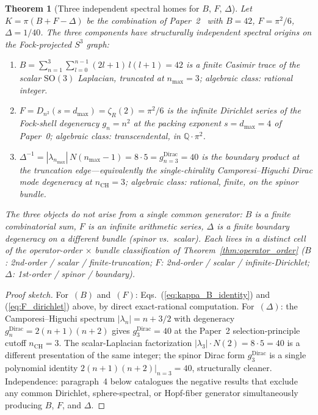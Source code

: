 \documentclass[aps,pra,twocolumn,superscriptaddress,longbibliography]{revtex4-2}
\newtheorem{theorem}{Theorem}
\begin{document}
\begin{theorem}[Three independent spectral homes for $B$, $F$, $\Delta$]
\label{thm:k_decomposition}
Let $K = \pi(B + F - \Delta)$ be the combination of
Paper~2~\cite{loutey_paper2} with $B = 42$, $F = \pi^2/6$,
$\Delta = 1/40$.  The three components have structurally independent
spectral origins on the Fock-projected $S^3$ graph:
\begin{enumerate}
\item[(B)] $B = \sum_{n=1}^{3} \sum_{l=0}^{n-1} (2l{+}1)\,l(l{+}1)
= 42$ is a \emph{finite} Casimir trace of the scalar
$\mathrm{SO}(3)$ Laplacian, truncated at $n_{\max} = 3$;
algebraic class: rational integer.
\item[(F)] $F = D_{n^2}(s = d_{\max}) = \zeta_R(2) = \pi^2/6$
is the \emph{infinite} Dirichlet series of the Fock-shell degeneracy
$g_n = n^2$ at the packing exponent $s = d_{\max} = 4$ of Paper~0;
algebraic class: transcendental, in $\mathbb{Q}\cdot\pi^2$.
\item[($\Delta$)] $\Delta^{-1} = |\lambda_{n_{\max}}|\,
N(n_{\max}{-}1) = 8 \cdot 5 = g_{n=3}^{\mathrm{Dirac}} = 40$ is the
\emph{boundary} product at the truncation edge---equivalently the
single-chirality Camporesi--Higuchi Dirac mode degeneracy at
$n_{\mathrm{CH}} = 3$; algebraic class: rational, finite, on the
\emph{spinor} bundle.
\end{enumerate}
The three objects do not arise from a single common generator:
$B$ is a finite combinatorial sum, $F$ is an infinite arithmetic
series, $\Delta$ is a finite boundary degeneracy on a different
bundle (spinor vs.\ scalar).  Each lives in a distinct cell of the
operator-order $\times$ bundle classification of
Theorem~\ref{thm:operator_order} ($B$: 2nd-order / scalar /
finite-truncation; $F$: 2nd-order / scalar / infinite-Dirichlet;
$\Delta$: 1st-order / spinor / boundary).
\end{theorem}

\begin{proof}[Proof sketch]
For~$(B)$ and~$(F)$: Eqs.~(\ref{eq:kappa_B_identity}) and
(\ref{eq:F_dirichlet}) above, by direct exact-rational computation.
For~$(\Delta)$: the Camporesi--Higuchi spectrum
$|\lambda_n| = n + 3/2$ with degeneracy
$g_n^{\mathrm{Dirac}} = 2(n+1)(n+2)$ gives $g_3^{\mathrm{Dirac}} = 40$
at the Paper~2 selection-principle cutoff $n_{\mathrm{CH}} = 3$.
The scalar-Laplacian factorization $|\lambda_3|\cdot N(2) =
8 \cdot 5 = 40$ is a different presentation of the same integer; the
spinor Dirac form $g_3^{\mathrm{Dirac}}$ is a single polynomial
identity $2(n{+}1)(n{+}2)|_{n=3} = 40$, structurally cleaner.
Independence: paragraph~4 below catalogues the negative results
that exclude any common Dirichlet, sphere-spectral, or Hopf-fiber
generator simultaneously producing $B$, $F$, and $\Delta$.
\end{proof}
\end{document}
